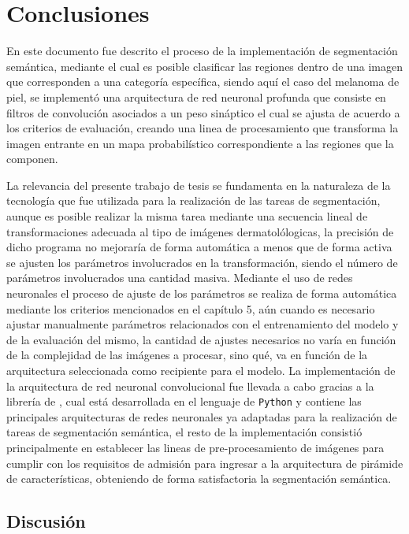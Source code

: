 \chapter{Conclusiones}

En este documento fue descrito el proceso de la implementación de segmentación semántica, mediante el cual es posible clasificar las regiones dentro de una imagen que corresponden a una categoría específica, siendo aquí el caso del melanoma de piel, se implementó una arquitectura de red neuronal profunda que consiste en filtros de convolución asociados a un peso sináptico el cual se ajusta de acuerdo a los criterios de evaluación, creando una linea de procesamiento que transforma la imagen entrante en un mapa probabilístico correspondiente a las regiones que la componen.

La relevancia del presente trabajo de tesis se fundamenta en la naturaleza de la tecnología que fue utilizada para la realización de las tareas de segmentación, aunque es posible realizar la misma tarea mediante una secuencia lineal de transformaciones adecuada al tipo de imágenes dermatolólogicas, la precisión de dicho programa no mejoraría de forma automática a menos que de forma activa se ajusten los parámetros involucrados en la transformación, siendo el número de parámetros involucrados una cantidad masiva. Mediante el uso de redes neuronales el proceso de ajuste de los parámetros se realiza de forma automática mediante los criterios mencionados en el capítulo 5, aún cuando es necesario ajustar manualmente parámetros relacionados con el entrenamiento del modelo y de la evaluación del mismo, la cantidad de ajustes necesarios no varía en función de la complejidad de las imágenes a procesar, sino qué, va en función de la arquitectura seleccionada como recipiente para el modelo. La implementación de la arquitectura de red neuronal convolucional fue llevada a cabo gracias a la librería de \citet{Yakubovskiy:2019}, cual está desarrollada en el lenguaje de \texttt{Python} y contiene las principales arquitecturas de redes neuronales ya adaptadas para la realización de tareas de segmentación semántica, el resto de la implementación consistió principalmente en establecer las lineas de pre-procesamiento de imágenes para cumplir con los requisitos de admisión para ingresar a la arquitectura de pirámide de características, obteniendo de forma satisfactoria la segmentación semántica.

\section{Discusión}

